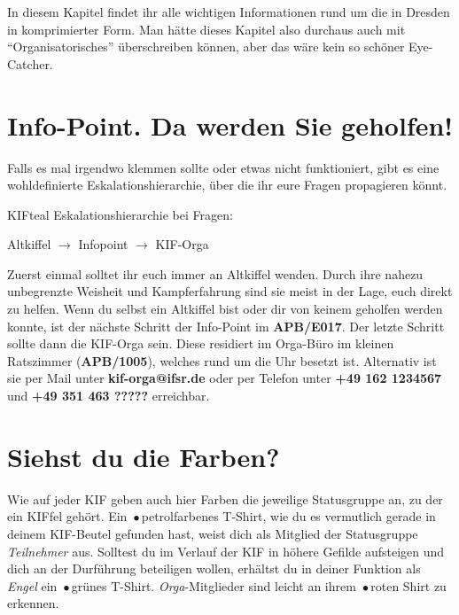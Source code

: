 
In diesem Kapitel findet ihr alle wichtigen Informationen rund um die \KIF{} in Dresden in komprimierter Form.
Man hätte dieses Kapitel also durchaus auch mit ``Organisatorisches'' überschreiben können, aber das wäre kein so schöner Eye-Catcher.

\section*{Info-Point. Da werden Sie geholfen!}

Falls es mal irgendwo klemmen sollte oder etwas nicht funktioniert, gibt es eine wohldefinierte Eskalationshierarchie, über die ihr eure Fragen propagieren könnt.

\begin{awesomeblock}[KIFteal]{2pt}{\faQuestion}{KIFteal}
  Eskalationshierarchie bei Fragen:

  Altkiffel $\longrightarrow$ Infopoint $\longrightarrow$ KIF-Orga
\end{awesomeblock}

Zuerst einmal solltet ihr euch immer an Altkiffel wenden.
Durch ihre nahezu unbegrenzte Weisheit und Kampferfahrung sind sie meist in der Lage, euch direkt zu helfen.
Wenn du selbst ein Altkiffel bist oder dir von keinem geholfen werden konnte, ist der nächste Schritt der Info-Point im \textbf{APB/E017}.
Der letzte Schritt sollte dann die KIF-Orga sein.
Diese residiert im Orga-Büro im kleinen Ratszimmer (\textbf{APB/1005}), welches rund um die Uhr besetzt ist.
Alternativ ist sie per Mail unter \textbf{kif-orga@ifsr.de} oder per Telefon unter \textbf{+49 162 1234567} und \textbf{+49 351 463 ?????} erreichbar.

\section*{Siehst du die Farben?}

Wie auf jeder KIF geben auch hier Farben die jeweilige Statusgruppe an, zu der ein KIFfel gehört.
Ein {\,\color{ShirtAttendee}$\bullet$\,}petrolfarbenes T-Shirt, wie du es vermutlich gerade in deinem KIF-Beutel gefunden hast, weist dich als Mitglied der Statusgruppe \emph{Teilnehmer} aus.
Solltest du im Verlauf der KIF in höhere Gefilde aufsteigen und dich an der Durführung beteiligen wollen, erhältst du in deiner Funktion als \emph{Engel} ein {\,\color{ShirtAngel}$\bullet$\,}grünes T-Shirt.
\emph{Orga}-Mitglieder sind leicht an ihrem {\,\color{ShirtOrga}$\bullet$\,}roten Shirt zu erkennen.

